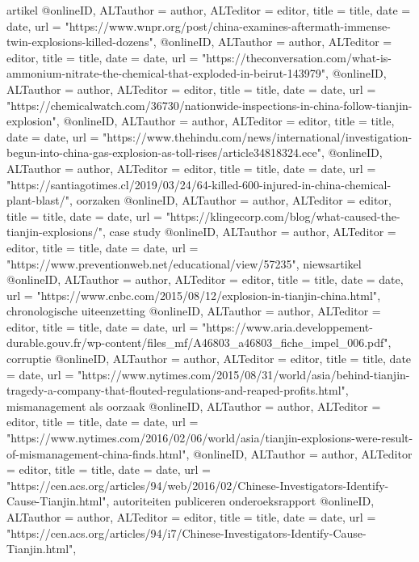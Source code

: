 {{{{{{{{artikel
@online{ID,	ALTauthor = {author},	ALTeditor = {editor},	title = {title},	date = {date},	url = {"https://www.wnpr.org/post/china-examines-aftermath-immense-twin-explosions-killed-dozens"},}
@online{ID,	ALTauthor = {author},	ALTeditor = {editor},	title = {title},	date = {date},	url = {"https://theconversation.com/what-is-ammonium-nitrate-the-chemical-that-exploded-in-beirut-143979"},}
@online{ID,	ALTauthor = {author},	ALTeditor = {editor},	title = {title},	date = {date},	url = {"https://chemicalwatch.com/36730/nationwide-inspections-in-china-follow-tianjin-explosion"},}
@online{ID,	ALTauthor = {author},	ALTeditor = {editor},	title = {title},	date = {date},	url = {"https://www.thehindu.com/news/international/investigation-begun-into-china-gas-explosion-as-toll-rises/article34818324.ece"},}
@online{ID,	ALTauthor = {author},	ALTeditor = {editor},	title = {title},	date = {date},	url = {"https://santiagotimes.cl/2019/03/24/64-killed-600-injured-in-china-chemical-plant-blast/"},}
oorzaken
@online{ID,	ALTauthor = {author},	ALTeditor = {editor},	title = {title},	date = {date},	url = {"https://klingecorp.com/blog/what-caused-the-tianjin-explosions/"},}
case study
@online{ID,	ALTauthor = {author},	ALTeditor = {editor},	title = {title},	date = {date},	url = {"https://www.preventionweb.net/educational/view/57235"},}
niewsartikel
@online{ID,	ALTauthor = {author},	ALTeditor = {editor},	title = {title},	date = {date},	url = {"https://www.cnbc.com/2015/08/12/explosion-in-tianjin-china.html"},}
chronologische uiteenzetting
@online{ID,	ALTauthor = {author},	ALTeditor = {editor},	title = {title},	date = {date},	url = {"https://www.aria.developpement-durable.gouv.fr/wp-content/files_mf/A46803_a46803_fiche_impel_006.pdf"},}
corruptie
@online{ID,	ALTauthor = {author},	ALTeditor = {editor},	title = {title},	date = {date},	url = {"https://www.nytimes.com/2015/08/31/world/asia/behind-tianjin-tragedy-a-company-that-flouted-regulations-and-reaped-profits.html"},}
mismanagement als oorzaak
@online{ID,	ALTauthor = {author},	ALTeditor = {editor},	title = {title},	date = {date},	url = {"https://www.nytimes.com/2016/02/06/world/asia/tianjin-explosions-were-result-of-mismanagement-china-finds.html"},}
@online{ID,	ALTauthor = {author},	ALTeditor = {editor},	title = {title},	date = {date},	url = {"https://cen.acs.org/articles/94/web/2016/02/Chinese-Investigators-Identify-Cause-Tianjin.html"},}
autoriteiten publiceren onderoeksrapport
@online{ID,	ALTauthor = {author},	ALTeditor = {editor},	title = {title},	date = {date},	url = {"https://cen.acs.org/articles/94/i7/Chinese-Investigators-Identify-Cause-Tianjin.html"},}
}}}}}}}}
